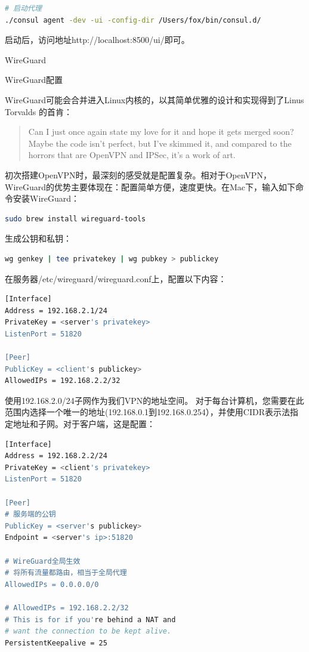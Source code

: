 \documentclass[8pt]{book}
\makeatletter
\numberwithin{dummy}{section}
\theoremstyle{ocrenumbox}
\theoremstyle{blacknumex}
\theoremstyle{blacknumbox}
\theoremstyle{ocrenum}
\renewcommand{\section}{\@startsection{section}{1}{\z@}
	{-4ex \@plus -1ex \@minus -.4ex}
	{1ex \@plus.2ex }
	{\normalfont\large\sffamily\bfseries}}
\renewcommand{\subsection}{\@startsection {subsection}{2}{\z@}
	{-3ex \@plus -0.1ex \@minus -.4ex}
	{0.5ex \@plus.2ex }
	{\normalfont\sffamily\bfseries}}
\makeatother
\begin{document}
\begin{lstlisting}[language=Bash]
# 启动代理
./consul agent -dev -ui -config-dir /Users/fox/bin/consul.d/
\end{lstlisting}


启动后，访问地址http://localhost:8500/ui/即可。

\section{WireGuard}

\subsection{WireGuard配置}

WireGuard可能会合并进入Linux内核的，以其简单优雅的设计和实现得到了Linus Torvalds 的首肯：

\begin{quote}
Can I just once again state my love for it and hope it gets merged soon? Maybe the code isn’t perfect, but I’ve skimmed it, and compared to the horrors that are OpenVPN and IPSec, it’s a work of art.
\end{quote}


初次搭建OpenVPN时，最深刻的感受就是配置复杂。相对于OpenVPN，WireGuard的优势主要体现在：配置简单方便，速度更快。在Mac下，输入如下命令安装WireGuard：

\begin{lstlisting}[language=Bash]
sudo brew install wireguard-tools
\end{lstlisting}


生成公钥和私钥：

\begin{lstlisting}[language=Bash]
wg genkey | tee privatekey | wg pubkey > publickey
\end{lstlisting}

在服务器/etc/wireguard/wireguard.conf上，配置以下内容：

\begin{lstlisting}[language=Bash]
[Interface]　　
Address = 192.168.2.1/24　　
PrivateKey = <server's privatekey>　　
ListenPort = 51820　　

[Peer]　　
PublicKey = <client's publickey>　　
AllowedIPs = 192.168.2.2/32
\end{lstlisting}

使用192.168.2.0/24子网作为我们VPN的地址空间。 对于每台计算机，您需要在此范围内选择一个唯一的地址(192.168.0.1到192.168.0.254），并使用CIDR表示法指定地址和子网。对于客户端，这是配置：
\begin{lstlisting}[language=Bash]
[Interface]　　
Address = 192.168.2.2/24　　
PrivateKey = <client's privatekey>　　
ListenPort = 51820
　　
[Peer]
# 服务端的公钥　　
PublicKey = <server's publickey>　　
Endpoint = <server's ip>:51820　　

# WireGuard全局生效
# 将所有流量都路由，相当于全局代理
AllowedIPs = 0.0.0.0/0

# AllowedIPs = 192.168.2.2/32　　
# This is for if you're behind a NAT and　　
# want the connection to be kept alive.　　
PersistentKeepalive = 25
\end{lstlisting}
\end{document}
